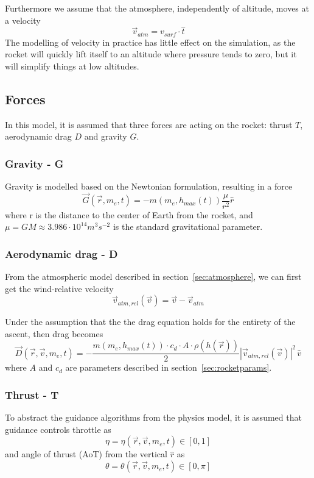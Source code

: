\documentclass[11pt]{article}
\begin{document}
Furthermore we assume that the atmosphere, independently of altitude, moves at a velocity
$$
\vec{v}_{atm} = v_{surf} \cdot \hat{t}
$$
The modelling of velocity in practice has little effect on the simulation, as the rocket will quickly lift itself to an altitude where pressure tends to zero,
but it will simplify things at low altitudes.


\subsection{Forces}
In this model, it is assumed that three forces are acting on the rocket: thrust $T$, aerodynamic drag $D$ and gravity $G$.

\subsubsection{Gravity - G}
Gravity is modelled based on the Newtonian formulation, resulting in a force
$$
\vec{G}(\vec{r}, m_e, t) = -m(m_e, h_{max}(t)) \frac{\mu}{r^2} \hat{r} 
$$
where r is the distance to the center of Earth from the rocket, and $\mu = GM \approx 3.986\cdot10^{14} m^3 s^{−2}$ is the standard gravitational parameter.

\subsubsection{Aerodynamic drag - D} \label{sec:drag}

From the atmospheric model described in section~\ref{sec:atmosphere}, we can first get the wind-relative velocity
$$
\vec{v}_{atm,rel} (\vec{v}) = \vec{v} - \vec{v}_{atm}
$$

Under the assumption that the the drag equation holds for the entirety of the ascent, then drag becomes
$$
\vec{D}(\vec{r}, \vec{v}, m_e, t) = - \frac{ m(m_e, h_{max}(t)) \cdot  c_d  \cdot A \cdot \rho(h(\vec{r})) }{2} {\left| \vec{v}_{atm,rel} (\vec{v}) \right|}^2 \, \hat{v}
$$
where $A$ and $c_d$ are parameters described in section~\ref{sec:rocketparams}.
\subsubsection{Thrust - T}

To abstract the guidance algorithms from the physics model, it is assumed that guidance controls throttle as
$$
\eta = \eta(\vec{r}, \vec{v}, m_e, t)\in[0,1]
$$
and angle of thrust (AoT) from the vertical $\hat{r}$ as
$$
\theta = \theta(\vec{r}, \vec{v}, m_e, t)\in\left[0,\pi\right]
$$
\end{document}
